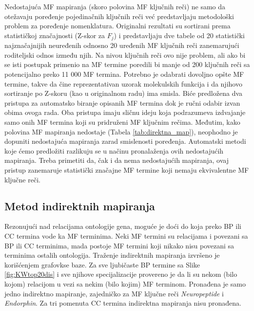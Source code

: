 Nedostajuća MF mapiranja (skoro polovina MF ključnih reči) ne samo da otežavaju
poređenje pojedinačnih ključnih reči već predstavljaju metodološki problem za
poređenje nomenklatura.  Originalni rezultati su sortirani prema statističkoj
značajnosti (Z-skor za $F_j$) i predstavljaju dve tabele od 20 statistički
najznačajnijih neuređenih odnosno 20 uređenih MF ključnih reči zanemarujući
roditeljski odnos između njih. Na nivou ključnih reči ovo nije problem, ali ako
bi se isti postupak primenio na MF termine poredili bi manje od 200 ključnih
reči sa potencijalno preko 11 000 MF termina. Potrebno je odabrati dovoljno
opšte MF termine, takve da čine reprezentativan uzorak molekulskih funkcija i
da njihovo sortiranje po Z-skoru (kao u originalnom radu) ima smisla.  Biće
predložena dva pristupa za automatsko biranje opisanih MF termina dok je ručni
odabir izvan obima ovoga rada.  Oba pristupa imaju sličnu ideju koja podrazumeva izdvajanje samo 
onih MF termina koji su pridruženi MF ključnim rečima. Međutim, kako polovina MF
mapiranja nedostaje (Tabela \ref{tab:direktna_map}), neophodno je dopuniti
nedostajuća mapiranja zarad smislenosti poređenja.  Automatski metodi koje ćemo
predložiti razlikuju se u načinu pronalaženja ovih nedostajućih mapiranja.
Treba primetiti da, čak i da nema nedostajućih mapiranja, ovaj pristup
zanemaruje statistički značajne MF termine koji nemaju ekvivalentne MF ključne
reči. 



\clearpage

\subsection{Metod indirektnih mapiranja}

Rezonujući nad relacijama ontologije gena, moguće je doći do
 koja preko BP ili CC termina vode ka MF
terminima. Neki MF termini su relacijama  i
 povezani sa BP ili CC terminima, mada postoje MF termini
koji nikako nisu povezani sa terminima ostalih  ontologija. Traženje
indirektnih mapiranja izvršeno je korišćenjem  grafovkse baze.
Za sve ljubičaste BP termine sa Slike \ref{fig:KWtop20dis} i sve njihove
specijalizacije provereno je da li su nekom (bilo kojom) relacijom u vezi sa
nekim (bilo kojim) MF terminom. Pronađena je samo jedno indirektno mapiranje,
zajedničko za MF ključne reči \textit{Neuropeptide} i \textit{Endorphin}. Za
tri pomenuta CC termina indirektna mapiranja nisu pronađena. 


